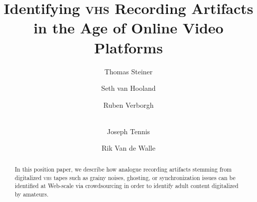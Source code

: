 \documentclass[runningheads,a4paper]{llncs}
\newcommand{\keywords}[1]{\par\addvspace\baselineskip
\noindent\keywordname\enspace\ignorespaces#1}
\begin{document}
\mainmatter

\title{Identifying {\scshape vhs} Recording Artifacts\\
in the Age of Online Video Platforms}


\author{Thomas Steiner \and
        Seth van Hooland \and
        Ruben Verborgh\and \\
        Joseph Tennis\and
        Rik Van de Walle}


\maketitle

\setcounter{footnote}{0}

\vspace{-2.7em}
\begin{abstract}
In this position paper, we describe how analogue recording artifacts
stemming from digitalized {\scshape vhs} tapes such as
grainy noises, ghosting, or synchronization issues
can be identified at Web-scale via crowdsourcing
in order to identify adult content digitalized by amateurs.
\end{abstract}


\vspace{-4em}
\end{document}
